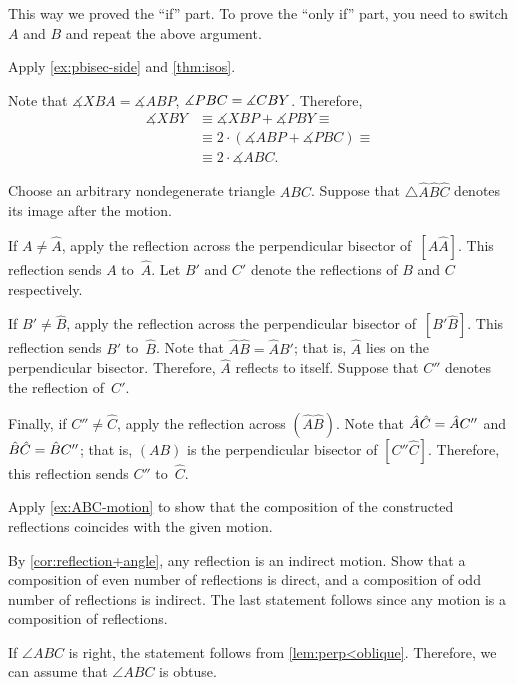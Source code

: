 \begin{multicols}{2}
This way we proved the ``if'' part.
To prove the ``only if'' part, you need to switch $A$ and $B$ and
repeat the above argument.

Apply \ref{ex:pbisec-side} and \ref{thm:isos}.

Note that $\measuredangle XBA=\measuredangle ABP$, $\measuredangle PBC\z=\measuredangle CBY$.
Therefore,
\begin{align*}
\measuredangle XBY
&\equiv
\measuredangle XBP+\measuredangle PBY\equiv
\\
&\equiv
 2\cdot(\measuredangle ABP+\measuredangle PBC)\equiv
\\
&
\equiv
 2\cdot \measuredangle ABC.
\end{align*}

\vskip-4mm

Choose an arbitrary nondegenerate triangle $ABC$.
Suppose that $\triangle \hat A \hat B\hat C$ denotes its image after the motion.

If $A\ne \hat A$, apply the reflection across the perpendicular bisector of~$[A\hat A]$.
This reflection sends $A$ to~$\hat A$.
Let $B'$ and $C'$ denote the reflections of $B$ and $C$ respectively.

If $B'\ne \hat B$, apply the reflection across the perpendicular bisector of~$[B'\hat B]$.
This reflection sends $B'$ to~$\hat B$.
Note that $\hat A\hat B=\hat AB'$;
that is, $\hat A$ lies on the perpendicular bisector. 
Therefore, $\hat A$ reflects to itself.
Suppose that $C''$ denotes the reflection of~$C'$.

Finally, if $C''\ne \hat C$, apply the reflection across $(\hat A\hat B)$.
Note that $\hat A\hat C\z=\hat AC''$ and $\hat B\hat C\z=\hat BC''$;
that is, $(AB)$ is the perpendicular bisector of $[C''\hat C]$.
Therefore, this reflection sends $C''$ to~$\hat C$.

Apply \ref{ex:ABC-motion} to show that the composition of the constructed reflections coincides with the given motion.

By \ref{cor:reflection+angle}, any reflection is an indirect motion.
Show that a composition of even number of reflections is direct,
and a composition of odd number of reflections is indirect.
The last statement follows since any motion is a composition of reflections.

If $\angle ABC$ is right, the statement follows from \ref{lem:perp<oblique}.
Therefore, we can assume that $\angle ABC$ is obtuse.


\end{multicols}
